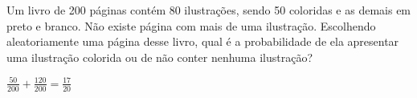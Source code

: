 \begin{ex}
Um livro de 200 páginas contém 80 ilustrações, sendo 50 coloridas e as demais em preto e branco. Não existe página com mais de uma ilustração. Escolhendo aleatoriamente uma página desse livro, qual é a probabilidade de ela apresentar uma ilustração colorida ou de não conter nenhuma ilustração?
 \begin{sol}
  $\frac{50}{200}+\frac{120}{200}=\frac{17}{20}$
 \end{sol}
\end{ex}